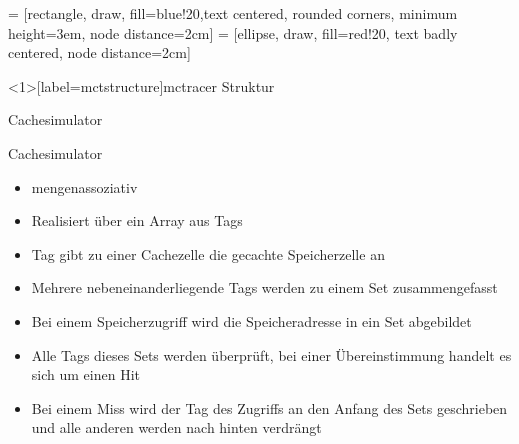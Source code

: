
 = [rectangle, draw, fill=blue!20,text centered, rounded corners, minimum height=3em, node distance=2cm]
 = [ellipse,   draw, fill=red!20, text badly centered, node distance=2cm]

\begin{frame}<1>[label=mctstructure]{mctracer Struktur}
\end{frame}

\begin{frame}{Cachesimulator}
	\begin{block}{Cachesimulator}
		\begin{itemize}[<+->]
			\item mengenassoziativ
			\item Realisiert über ein Array aus Tags
			\item Tag gibt zu einer Cachezelle die gecachte Speicherzelle an
			\item Mehrere nebeneinanderliegende Tags werden zu einem Set zusammengefasst
			\item Bei einem Speicherzugriff wird die Speicheradresse in ein Set abgebildet
			\item Alle Tags dieses Sets werden überprüft, bei einer Übereinstimmung handelt es sich um einen Hit
			\item Bei einem Miss wird der Tag des Zugriffs an den Anfang des Sets geschrieben und alle anderen werden nach hinten verdrängt
		\end{itemize}
	\end{block}
\end{frame}

